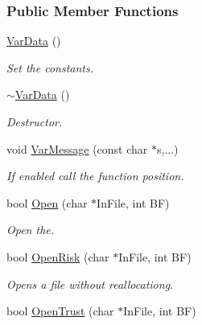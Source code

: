 \subsubsection*{Public Member Functions}
\begin{DoxyCompactItemize}
\item 
\hyperlink{classVarData_a159e408a7c67c4b4ff12edd72d315bd4}{Var\+Data} ()\hypertarget{classVarData_a159e408a7c67c4b4ff12edd72d315bd4}{}\label{classVarData_a159e408a7c67c4b4ff12edd72d315bd4}

\begin{DoxyCompactList}\small\item\em Set the constants. \end{DoxyCompactList}\item 
\hyperlink{classVarData_a66a331d8378209908c6b154d79723977}{$\sim$\+Var\+Data} ()\hypertarget{classVarData_a66a331d8378209908c6b154d79723977}{}\label{classVarData_a66a331d8378209908c6b154d79723977}

\begin{DoxyCompactList}\small\item\em Destructor. \end{DoxyCompactList}\item 
void \hyperlink{classVarData_a616b8e0974fde7798bb09b9af1b339ae}{Var\+Message} (const char $\ast$s,...)\hypertarget{classVarData_a616b8e0974fde7798bb09b9af1b339ae}{}\label{classVarData_a616b8e0974fde7798bb09b9af1b339ae}

\begin{DoxyCompactList}\small\item\em If enabled call the function position. \end{DoxyCompactList}\item 
bool \hyperlink{classVarData_a50a785f6295f7e7fb2494fcad2a2a7fc}{Open} (char $\ast$In\+File, int BF)
\begin{DoxyCompactList}\small\item\em Open the. \end{DoxyCompactList}\item 
bool \hyperlink{classVarData_a385ea4b67d94de234204940ef8da368d}{Open\+Risk} (char $\ast$In\+File, int BF)\hypertarget{classVarData_a385ea4b67d94de234204940ef8da368d}{}\label{classVarData_a385ea4b67d94de234204940ef8da368d}

\begin{DoxyCompactList}\small\item\em Opens a file without reallocationg. \end{DoxyCompactList}\item 
bool \hyperlink{classVarData_a2d7ca8dfc2fc40c902e22b3110f359ca}{Open\+Trust} (char $\ast$In\+File, int BF)\hypertarget{classVarData_a2d7ca8dfc2fc40c902e22b3110f359ca}{}\label{classVarData_a2d7ca8dfc2fc40c902e22b3110f359ca}


\end{DoxyCompactItemize}
